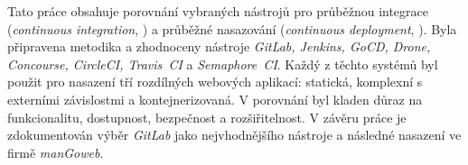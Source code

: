 Tato práce obsahuje porovnání vybraných nástrojů pro průběžnou integrace (\textit{continuous integration}, \CI) a průběžné nasazování (\textit{continuous deployment}, \CD). Byla připravena metodika a zhodnoceny nástroje \textit{GitLab, Jenkins, GoCD, Drone, Concourse, CircleCI, Travis~CI} a \textit{Semaphore~CI}. Každý z těchto systémů byl použit pro nasazení tří rozdílných webových aplikací: statická, komplexní s externími závislostmi a kontejnerizovaná. V porovnání byl kladen důraz na funkcionalitu, dostupnost, bezpečnost a rozšiřitelnost. V závěru práce je zdokumentován výběr \textit{GitLab} jako nejvhodnějšího nástroje a následné nasazení \CICD ve firmě \textit{manGoweb}.
